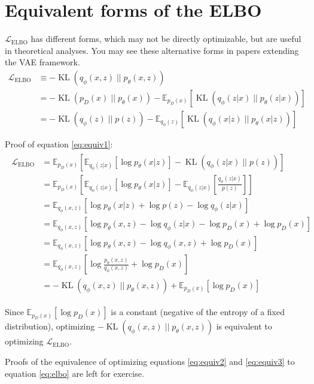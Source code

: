 \documentclass{article}
\newcommand{\kl}[2]{\operatorname{KL}({#1} \; || \; {#2})}
\begin{document}
\section{Equivalent forms of the ELBO}
$\mathcal{L}_\text{ELBO}$ has different forms, which may not be directly optimizable, but are useful in theoretical analyses. You may see these alternative forms in papers extending the VAE framework.
\begin{align}
    \mathcal{L}_\text{ELBO} &\equiv -\kl{q_\phi(x, z)}{p_\theta(x, z)} \label{eq:equiv1}\\
    &= -\kl{p_D(x)}{p_\theta(x)} - \mathbb{E}_{p_D(x)}[\kl{q_\phi(z|x)}{p_\theta(z|x)}] \label{eq:equiv2}\\
    &= -\kl{q_\phi(z)}{p(z)} - \mathbb{E}_{q_\phi(z)}[\kl{q_\phi(x|z)}{p_\theta(x|z)}] \label{eq:equiv3}
\end{align}

Proof of equation \ref{eq:equiv1}:
\begin{align}
    \begin{split}
        \mathcal{L}_{\text{ELBO}} &= \mathbb{E}_{p_D(x)} \left[ \mathbb{E}_{q_\phi(z|x)}[\log p_\theta(x|z)] - \kl{q_\phi(z|x)}{p(z)} \right] \\
        &= \mathbb{E}_{p_D(x)} \left[ \mathbb{E}_{q_\phi(z|x)}[\log p_\theta(x|z)] - \mathbb{E}_{q_\phi(z|x)}[\frac{q_\phi(z|x)}{p(z)}] \right] \\
        &= \mathbb{E}_{q_\phi(x, z)} \left[ \log p_\theta(x|z) + \log p(z) - \log q_\phi(z|x) \right] \\
        &= \mathbb{E}_{q_\phi(x, z)} \left[ \log p_\theta(x, z) - \log q_\phi(z|x) - \log p_D(x) + \log p_D(x) \right] \\
        &= \mathbb{E}_{q_\phi(x, z)} \left[ \log p_\theta(x, z) - \log q_\phi(x, z) + \log p_D(x) \right] \\
        &= \mathbb{E}_{q_\phi(x, z)} \left[ \log \frac{p_\theta(x, z)}{q_\phi(x, z)} + \log p_D(x) \right] \\
        &= -\kl{q_\phi(x, z)}{p_\theta(x, z)} + \mathbb{E}_{p_D(x)} \left[ \log p_D(x) \right]
    \end{split}
\end{align}

Since $\mathbb{E}_{p_D(x)}[\log p_D(x)]$ is a constant (negative of the entropy of a fixed distribution), optimizing $-\kl{q_\phi(x, z)}{p_\theta(x, z)}$ is equivalent to optimizing $\mathcal{L}_\text{ELBO}$. 

Proofs of the equivalence of optimizing equations \ref{eq:equiv2} and \ref{eq:equiv3} to equation \ref{eq:elbo} are left for exercise.


\nocite{*}

\end{document}
